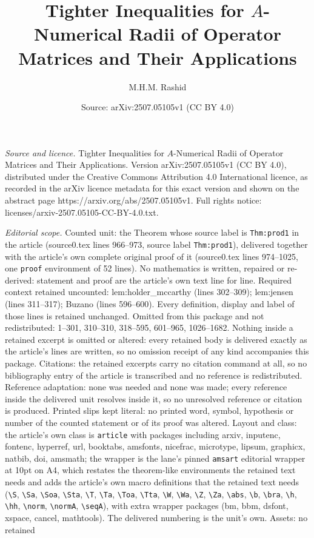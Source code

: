 \documentclass[10pt,a4paper]{amsart}
\title[Tighter Inequalities for $A$-Numerical Radii of Operator Mat]{Tighter Inequalities for $A$-Numerical Radii of Operator Matrices and Their Applications}
\author{M.H.M. Rashid}
\date{Source: arXiv:2507.05105v1 (CC BY 4.0)}
\begin{document}
\maketitle

\noindent\emph{Source and licence.} Tighter Inequalities for $A$-Numerical Radii of Operator Matrices and Their Applications. Version arXiv:2507.05105v1 (CC BY 4.0), distributed under the Creative Commons Attribution 4.0 International licence, as recorded in the arXiv licence metadata for this exact version and shown on the abstract page https://arxiv.org/abs/2507.05105v1. Full rights notice: licenses/arxiv-2507.05105-CC-BY-4.0.txt.\par\smallskip

\noindent\textit{Editorial scope.} Counted unit: the Theorem whose source label is \texttt{Thm:prod1} in the article (source0.tex lines 966--973, source label \texttt{Thm:prod1}), delivered together with the article's own complete original proof of it (source0.tex lines 974--1025, one \texttt{proof} environment of 52 lines). No mathematics is written, repaired or re-derived: statement and proof are the article's own text line for line. Required context retained uncounted: lem:holder\_mccarthy (lines 302--309); lem:jensen (lines 311--317); Buzano (lines 596--600). Every definition, display and label of those lines is retained unchanged. Omitted from this package and not redistributed: 1--301, 310--310, 318--595, 601--965, 1026--1682. Nothing inside a retained excerpt is omitted or altered: every retained body is delivered exactly as the article's lines are written, so no omission receipt of any kind accompanies this package. Citations: the retained excerpts carry no citation command at all, so no bibliography entry of the article is transcribed and no reference is redistributed. Reference adaptation: none was needed and none was made; every reference inside the delivered unit resolves inside it, so no unresolved reference or citation is produced. Printed slips kept literal: no printed word, symbol, hypothesis or number of the counted statement or of its proof was altered. Layout and class: the article's own class is \texttt{article} with packages including arxiv, inputenc, fontenc, hyperref, url, booktabs, amsfonts, nicefrac, microtype, lipsum, graphicx, natbib, doi, amsmath; the wrapper is the lane's pinned \texttt{amsart} editorial wrapper at 10pt on A4, which restates the theorem-like environments the retained text needs and adds the article's own macro definitions that the retained text needs (\texttt{\textbackslash S}, \texttt{\textbackslash Sa}, \texttt{\textbackslash Soa}, \texttt{\textbackslash Sta}, \texttt{\textbackslash T}, \texttt{\textbackslash Ta}, \texttt{\textbackslash Toa}, \texttt{\textbackslash Tta}, \texttt{\textbackslash W}, \texttt{\textbackslash Wa}, \texttt{\textbackslash Z}, \texttt{\textbackslash Za}, \texttt{\textbackslash abs}, \texttt{\textbackslash b}, \texttt{\textbackslash bra}, \texttt{\textbackslash h}, \texttt{\textbackslash hh}, \texttt{\textbackslash norm}, \texttt{\textbackslash normA}, \texttt{\textbackslash seqA}), with extra wrapper packages (bm, bbm, dsfont, xspace, cancel, mathtools). The delivered numbering is the unit's own. Assets: no retained 
\end{document}

